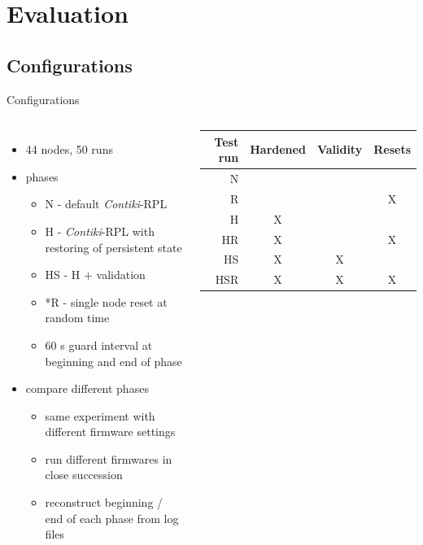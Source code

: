 \documentclass[fleqn,11pt,aspectratio=1610]{beamer}
\begin{document}
\section{Evaluation}

\subsection{Configurations}

\begin{frame}{Configurations}
  \begin{columns}
    \begin{itemize}
    \item<1-> 44 nodes, 50 runs
    \item<2-> phases
      \begin{itemize}
      \item N - default \emph{Contiki}-RPL
      \item H - \emph{Contiki}-RPL with restoring of persistent state
      \item HS - H + validation
      \item *R - single node reset at random time
      \item 60 s guard interval at beginning and end of phase
      \end{itemize}
    \item<3-> compare different phases
      \begin{itemize}
      \item same experiment with different firmware settings
      \item run different firmwares in close succession
      \item reconstruct beginning / end of each phase from log files
      \end{itemize}
    \end{itemize}
    \begin{table}[h]
      \centering
      \footnotesize
      \begin{tabular}{r c c c}
        \toprule
        Test run & Hardened & Validity & Resets \\
        \midrule
        N   &   &   &   \\
        R   &   &   & X \\
        H   & X &   &   \\
        HR  & X &   & X \\
        HS  & X & X &   \\
        HSR & X & X & X \\
      \end{tabular}
    \end{table}
  \end{columns}
\end{frame}
\end{document}
